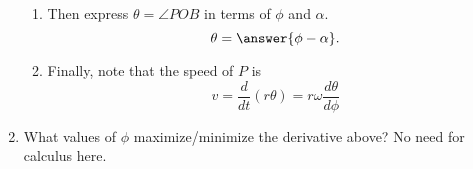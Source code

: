 \documentclass{ximera}
\begin{document}
\begin{question}
\begin{enumerate}
\begin{hint}
\begin{enumerate}
\item Then express $\theta = \angle POB$ in terms of $\phi$ and $\alpha$. 
\[
  \theta = \answer{\phi - \alpha} .
\]

\item Finally, note that the speed of $P$ is
\[
   v = \frac{d}{dt} (r\theta) = r\omega \frac{d\theta}{d\phi}
\]

\end{enumerate}
\end{hint}

\item What values of $\phi$ maximize/minimize the derivative above? No need for calculus here.

\end{enumerate}



\end{question}
\end{document}
